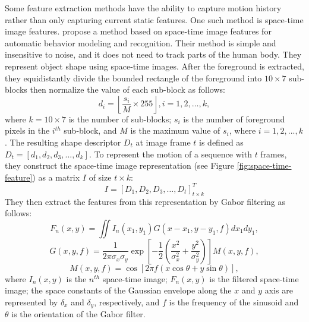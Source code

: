 Some feature extraction methods have the ability to capture motion
history rather than only capturing current static features.  One such
method is space-time image features.  propose
a method based on space-time image features for automatic behavior
modeling and recognition. Their method is simple and insensitive to
noise, and it does not need to track parts of the human body. They
represent object shape using space-time images. After the foreground
is extracted, they equidistantly divide the bounded rectangle of the
foreground into $10\times7$ sub-blocks then normalize the value of
each sub-block as follows:
\[
  d_i = \left\lfloor {\frac{{s_i}}{{M}}\times255} \right\rfloor, i =
    1,2, \ldots,k,
\]
where $k=10\times7$ is the number of sub-blocks; $s_i$ is the number
of foreground pixels in the $i^{th}$ sub-block, and $M$ is the maximum
value of $s_i$, where $i=1,2,...,k$. The resulting shape descriptor
$D_t$ at image frame $t$ is defined as $D_t =
[d_1,d_2,d_3,...,d_k]$. To represent the motion of a sequence with $t$
frames, they construct the space-time image representation (see
Figure \ref{fig:space-time-feature}) as a matrix $I$ of size $t\times
k$:
\[
  I = [D_1,D_2,D_3, \ldots ,D_t]^{T}_{t\times k}
\]
They then extract the features from this representation by Gabor
filtering as follows:
\[
  F_n (x,y) = \iint {I_n (x_1 ,y_1 )G(x - x_1 ,y - y_1 ,f)dx_1dy_1},
\]
\[
  G(x,y,f) = \frac{1}{{2\pi \sigma _x \sigma _y }}\exp \left[ {
  - \frac{1}{2}\left( {\frac{{x^2 }}{{\sigma _x^2 }} + \frac{{y^2
  }}{{\sigma _y^2 }}} \right)} \right]M(x,y,f),
\]
\[
  M(x,y,f) = \cos \left[ {2\pi f(x\cos \theta +
  y\sin \theta)} \right],
\]
where $I_n(x,y)$ is the $n^{th}$ space-time image; $F_n(x,y)$ is the
filtered space-time image; the space constants of the Gaussian
envelope along the $x$ and $y$ axis are represented by $\delta _x$ and
$\delta _y$, respectively, and $f$ is the frequency of the sinusoid
and $\theta$ is the orientation of the Gabor filter.

